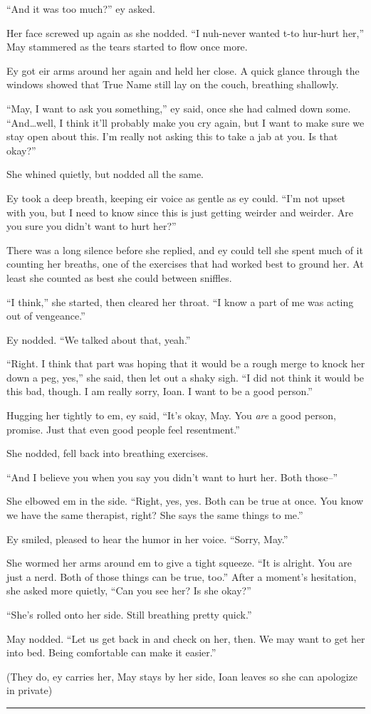 ``And it was too much?'' ey asked.

Her face screwed up again as she nodded. ``I nuh-never wanted t-to hur-hurt her,'' May stammered as the tears started to flow once more.

Ey got eir arms around her again and held her close. A quick glance through the windows showed that True Name still lay on the couch, breathing shallowly.

``May, I want to ask you something,'' ey said, once she had calmed down some. ``And\ldots well, I think it'll probably make you cry again, but I want to make sure we stay open about this. I'm really not asking this to take a jab at you. Is that okay?''

She whined quietly, but nodded all the same.

Ey took a deep breath, keeping eir voice as gentle as ey could. ``I'm not upset with you, but I need to know since this is just getting weirder and weirder. Are you sure you didn't want to hurt her?''

There was a long silence before she replied, and ey could tell she spent much of it counting her breaths, one of the exercises that had worked best to ground her. At least she counted as best she could between sniffles.

``I think,'' she started, then cleared her throat. ``I know a part of me was acting out of vengeance.''

Ey nodded. ``We talked about that, yeah.''

``Right. I think that part was hoping that it would be a rough merge to knock her down a peg, yes,'' she said, then let out a shaky sigh. ``I did not think it would be this bad, though. I am really sorry, Ioan. I want to be a good person.''

Hugging her tightly to em, ey said, ``It's okay, May. You \emph{are} a good person, promise. Just that even good people feel resentment.''

She nodded, fell back into breathing exercises.

``And I believe you when you say you didn't want to hurt her. Both those--''

She elbowed em in the side. ``Right, yes, yes. Both can be true at once. You know we have the same therapist, right? She says the same things to me.''

Ey smiled, pleased to hear the humor in her voice. ``Sorry, May.''

She wormed her arms around em to give a tight squeeze. ``It is alright. You are just a nerd. Both of those things can be true, too.'' After a moment's hesitation, she asked more quietly, ``Can you see her? Is she okay?''

``She's rolled onto her side. Still breathing pretty quick.''

May nodded. ``Let us get back in and check on her, then. We may want to get her into bed. Being comfortable can make it easier.''

(They do, ey carries her, May stays by her side, Ioan leaves so she can apologize in private)

\begin{center}\rule{0.5\linewidth}{0.5pt}\end{center}
